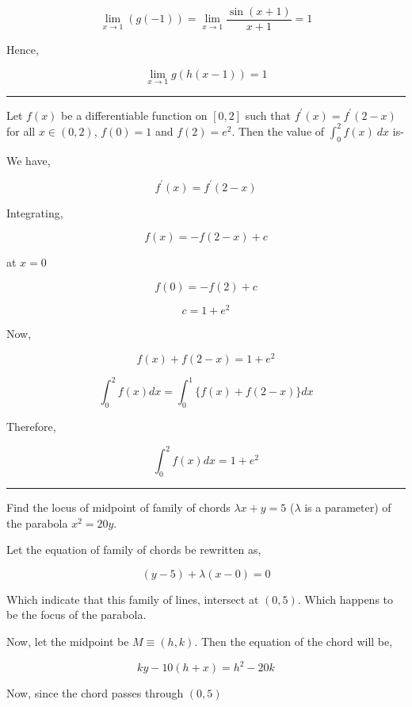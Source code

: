 \documentclass[twocolumn]{article}
\begin{document}
\[
    \lim_{x \to 1} (g(-1)) = \lim_{x \to 1} \frac{\sin (x +1)}{x+ 1} = 1 \tag{\(\because x+1 \to 0\) when \(x\to-1\)  }
\]

Hence, 

\[
    \boxed{\lim_{x \to 1} g(h(x-1)) = 1} 
\]

\hrule

\begin{question}
    Let \(f(x)\) be a differentiable function on \([0,2]\) such that \(f^{\prime} (x) = f^{\prime} (2- x)\) for all \(x \in (0, 2)\), \(f(0) = 1\) and \(f(2)  = e^{2}\). Then the value of \(\displaystyle \int_{0}^2 f(x)\ dx\) is-   
\end{question}

We have, 

\[
    f^{\prime} (x)  = f^{\prime} (2 -x)
\]

Integrating,

\[
    f(x) = - f(2 - x) + c
\]

at \(x = 0\) 

\[
    f(0) = -f(2) + c
\]

\[
    c = 1 + e^{2} 
\]

Now, 

\[
    f(x) + f(2 - x) = 1 + e^{2} 
\]

\[
    \int_0 ^2 f(x) dx = \int_0 ^1 \{f(x) + f(2-x)\} dx
\]

Therefore, 

\[
    \boxed{\int_{0} ^2 f(x)dx = 1 + e^{2} }
\]

\hrule 

\begin{question}
    Find the locus of midpoint of family of chords \(\lambda x + y = 5\) (\(\lambda\) is a parameter) of the parabola \(x^{2} = 20y\).   
\end{question}

Let the equation of family of chords be rewritten as, 

\[
    (y-5)+ \lambda (x - 0) = 0
\]

Which indicate that this family of lines, intersect at \((0, 5)\). Which happens to be the focus of the parabola.

\vspace*{0.1in}

Now, let the midpoint be \(M \equiv (h, k)\). Then the equation of the chord will be,  

\[
    ky - 10(h + x) = h^{2} - 20k
\]

Now, since the chord passes through \((0, 5)\) 
\end{document}
